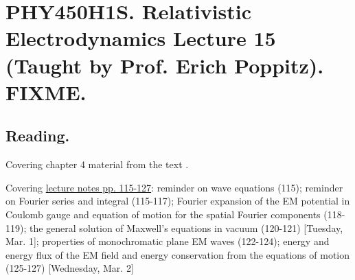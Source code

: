 
%

\chapter{PHY450H1S.  Relativistic Electrodynamics Lecture 15 (Taught by Prof. Erich Poppitz).  FIXME.}
\label{chap:relativisticElectrodynamicsL15}
{}
\date{Feb 16, 2011}

\beginArtNoToc

\section{Reading.}

Covering chapter 4 material from the text \cite{landau1980classical}.

Covering \href{http://www.physics.utoronto.ca/~poppitz/e-poppitz/PHY450_files/RelEMpp115-127.pdf}{lecture notes pp. 115-127}: reminder on wave equations (115); reminder on Fourier series and integral (115-117); Fourier expansion of the EM potential in Coulomb gauge and equation of motion for the spatial Fourier components (118-119); the general solution of Maxwell's equations in vacuum (120-121) [Tuesday, Mar. 1]; properties of monochromatic plane EM waves (122-124); energy and energy flux of the EM field and energy conservation from the equations of motion (125-127)  [Wednesday, Mar. 2]

\section{}

\EndArticle
